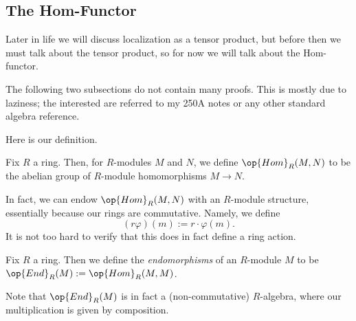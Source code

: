 \subsection{The \textrm{Hom}-Functor}
Later in life we will discuss localization as a tensor product, but before then we must talk about the tensor product, so for now we will talk about the \textrm{Hom}-functor.
\begin{warn}
	The following two subsections do not contain many proofs. This is mostly due to laziness; the interested are referred to my 250A notes or any other standard algebra reference.
\end{warn}
Here is our definition.
\begin{definition}
	Fix $R$ a ring. Then, for $R$-modules $M$ and $N$, we define $\op{Hom}_R(M,N)$ to be the abelian group of $R$-module homomorphisms $M\to N$.
\end{definition}
In fact, we can endow $\op{Hom}_R(M,N)$ with an $R$-module structure, essentially because our rings are commutative. Namely, we define
\[(r\varphi)(m):=r\cdot\varphi(m).\]
It is not too hard to verify that this does in fact define a ring action.
\begin{definition}
	Fix $R$ a ring. Then we define the \textit{endomorphisms} of an $R$-module $M$ to be $\op{End}_R(M):=\op{Hom}_R(M,M)$.
\end{definition}
Note that $\op{End}_R(M)$ is in fact a (non-commutative) $R$-algebra, where our multiplication is given by composition.

